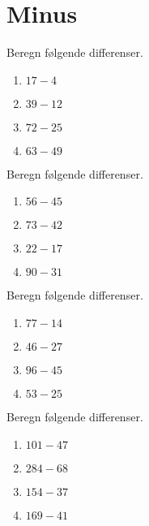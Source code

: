 \documentclass[../main.tex]{subfiles}
\begin{document}
\section{Minus}

\begin{prob}
    Beregn følgende differenser.
    \begin{enumerate}[label=\alph*)]
        \item \(\displaystyle 17-4\)
        \vspace{3mm}
        \item \(\displaystyle 39-12\)
        \vspace{3mm}
        \item \(\displaystyle 72-25\)
        \vspace{3mm}
        \item \(\displaystyle 63 - 49\)
    \end{enumerate}
\end{prob}

\begin{prob}
    Beregn følgende differenser.
    \begin{enumerate}[label=\alph*)]
        \item \(\displaystyle 56 - 45\)
        \vspace{3mm}
        \item \(\displaystyle 73 - 42\)
        \vspace{3mm}
        \item \(\displaystyle 22 - 17\)
        \vspace{3mm}
        \item \(\displaystyle 90 - 31\)
    \end{enumerate}
\end{prob}
\begin{prob}
    Beregn følgende differenser.
    \begin{enumerate}[label=\alph*)]
        \item \(\displaystyle 77 - 14\)
        \vspace{3mm}
        \item \(\displaystyle 46 - 27\)
        \vspace{3mm}
        \item \(\displaystyle 96 - 45\)
        \vspace{3mm}
        \item \(\displaystyle 53 - 25\)
    \end{enumerate}
\end{prob}
\begin{prob}
    Beregn følgende differenser.
    \begin{enumerate}[label=\alph*)]
        \item \(\displaystyle 101 - 47\)
        \vspace{3mm}
        \item \(\displaystyle 284 - 68\)
        \vspace{3mm}
        \item \(\displaystyle 154 - 37\)
        \vspace{3mm}
        \item \(\displaystyle 169 - 41\)
    \end{enumerate}
\end{prob}
\end{document}
